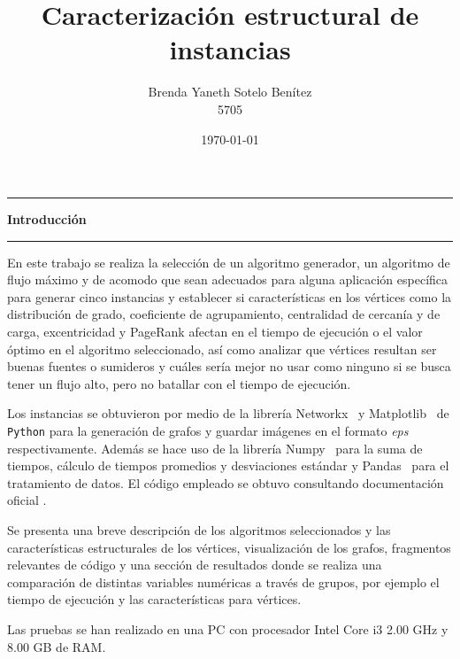 \documentclass{article}
\title{\textbf{Caracterización estructural de instancias}}
\author{Brenda Yaneth Sotelo Benítez \\ 5705}
\date{\today}
\begin{document}
\maketitle

\begin{center}\rule{1.0\textwidth}{0.1mm} \end{center}
\vspace{-1cm}
\begin{center} \Large{\textbf{Introducción}} \end{center}
\vspace{-1cm}
\begin{center}\rule{\textwidth}{0.2mm} \end{center}

En este trabajo se realiza la selección de un algoritmo generador, un algoritmo de flujo máximo y de acomodo que sean adecuados para alguna aplicación específica para  generar cinco instancias y establecer si características en los vértices como la distribución de grado, coeficiente de agrupamiento, centralidad de cercanía y de carga, excentricidad y PageRank afectan en el tiempo de ejecución o el valor óptimo en el algoritmo seleccionado, así como analizar que vértices resultan ser buenas fuentes o sumideros y cuáles sería mejor no usar como ninguno si se busca tener un flujo alto, pero no batallar con el tiempo de ejecución. 

Los instancias se obtuvieron por medio de la librería \color{blue}Networkx\color{black}\ \cite{Net} y \color{blue}Matplotlib\color{black}\ \cite{Mat} de \texttt{Python} \cite{Python} para la generación de grafos y guardar imágenes en el formato \textit{eps} respectivamente. Además se hace uso de la librería \color{blue}Numpy\color{black}\ \cite{Num} para la suma de tiempos, cálculo de tiempos promedios y desviaciones estándar y \color{blue}Pandas\color{black}\ \cite{Pd} para el tratamiento de datos. El código empleado se obtuvo consultando documentación oficial \cite{network}. 

Se presenta una breve descripción de los algoritmos seleccionados y las características estructurales de los vértices, visualización de los grafos, fragmentos relevantes de código y una sección de resultados donde se realiza una comparación de distintas variables numéricas a través de grupos, por ejemplo el tiempo de ejecución y las características para vértices.

Las pruebas se han realizado en una PC con procesador Intel Core i3 2.00 GHz y 8.00 GB de RAM.
\end{document}
